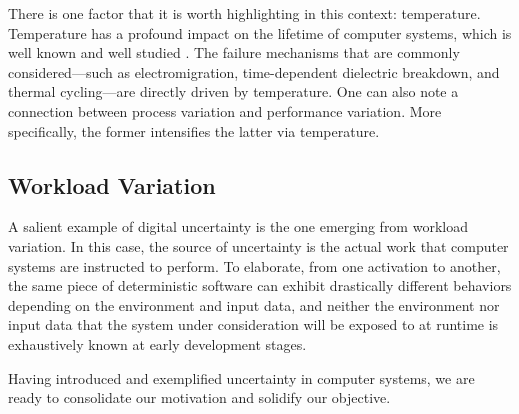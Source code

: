 There is one factor that it is worth highlighting in this context: temperature.
Temperature has a profound impact on the lifetime of computer systems, which is
well known and well studied \cite{jedec2016}. The failure mechanisms that are
commonly considered---such as electromigration, time-dependent dielectric
breakdown, and thermal cycling---are directly driven by temperature. One can
also note a connection between process variation and performance variation. More
specifically, the former intensifies the latter via temperature.

\subsection{Workload Variation}

A salient example of digital uncertainty is the one emerging from workload
variation. In this case, the source of uncertainty is the actual work that
computer systems are instructed to perform. To elaborate, from one activation to
another, the same piece of deterministic software can exhibit drastically
different behaviors depending on the environment and input data, and neither the
environment nor input data that the system under consideration will be exposed
to at runtime is exhaustively known at early development stages.

\conclusioncut
Having introduced and exemplified uncertainty in computer systems, we are ready
to consolidate our motivation and solidify our objective.
